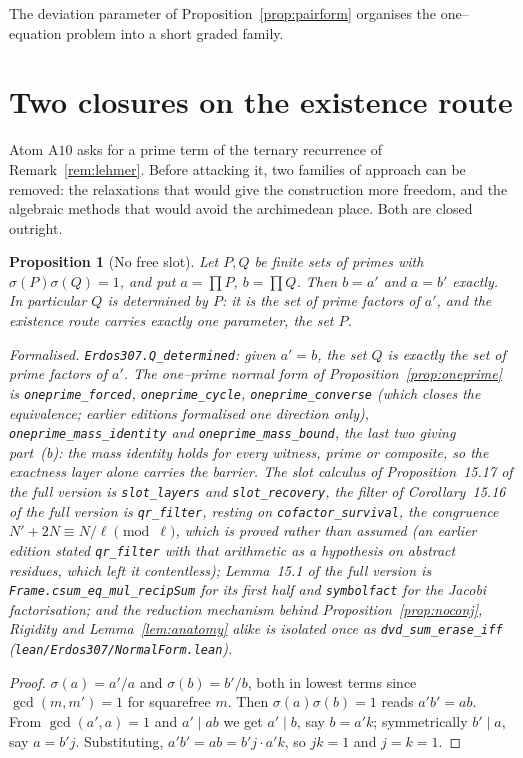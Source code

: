 \documentclass[11pt]{article}
\newtheorem{proposition}[theorem]{Proposition}
\theoremstyle{definition}
\begin{document}
The deviation parameter of Proposition~\ref{prop:pairform} organises the one--equation problem into a
short graded family.

\section{Two closures on the existence route}\label{sec:exclosure}

Atom $\mathrm{A}10$ asks for a prime term of the ternary recurrence of
Remark~\textup{\ref{rem:lehmer}}. Before attacking it, two families of approach can be removed:
the relaxations that would give the construction more freedom, and the algebraic methods that
would avoid the archimedean place. Both are closed outright.

\begin{proposition}[No free slot]\label{prop:nofreeslot}
Let $P,Q$ be finite sets of primes with $\sigma(P)\sigma(Q)=1$, and put $a=\prod P$, $b=\prod Q$.
Then $b=a'$ and $a=b'$ exactly. In particular $Q$ is \emph{determined} by $P$: it is the set of
prime factors of $a'$, and the existence route carries exactly one parameter, the set $P$.

\textup{Formalised.} \texttt{Erdos307.Q\_determined}: given $a'=b$, the set $Q$ is exactly the set of
prime factors of $a'$. The one--prime normal form of Proposition~\ref{prop:oneprime} is
\texttt{oneprime\_forced}, \texttt{oneprime\_cycle}, \texttt{oneprime\_converse}
\textup{(}which closes the equivalence; earlier editions formalised one direction only\textup{)},
\texttt{oneprime\_mass\_identity} and \texttt{oneprime\_mass\_bound}, the last two giving
part~\textup{(b)}: the mass identity holds for
\emph{every} witness, prime or composite, so the exactness layer alone carries the barrier. The slot
calculus of Proposition~15.17 of the full version is \texttt{slot\_layers} and \texttt{slot\_recovery}, the
filter of Corollary~15.16 of the full version is \texttt{qr\_filter}, resting on \texttt{cofactor\_survival},
the congruence $N'+2N\equiv N/\ell\pmod\ell$, which is proved rather than assumed (an earlier edition
stated \texttt{qr\_filter} with that arithmetic as a hypothesis on abstract residues, which left it
contentless); Lemma~15.1 of the full version is \texttt{Frame.csum\_eq\_mul\_recipSum} for its first half
and \texttt{symbolfact} for the Jacobi factorisation; and the reduction mechanism behind
Proposition~\ref{prop:noconj}, Rigidity and Lemma~\ref{lem:anatomy} alike is isolated once as
\texttt{dvd\_sum\_erase\_iff} \textup{(\texttt{lean/Erdos307/NormalForm.lean})}.
\end{proposition}
\begin{proof}
$\sigma(a)=a'/a$ and $\sigma(b)=b'/b$, both in lowest terms since $\gcd(m,m')=1$ for squarefree
$m$. Then $\sigma(a)\sigma(b)=1$ reads $a'b'=ab$. From $\gcd(a',a)=1$ and $a'\mid ab$ we get
$a'\mid b$, say $b=a'k$; symmetrically $b'\mid a$, say $a=b'j$. Substituting,
$a'b'=ab=b'j\cdot a'k$, so $jk=1$ and $j=k=1$.
\end{proof}
\end{document}
